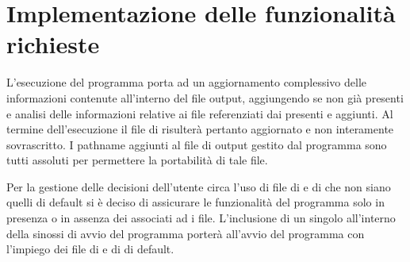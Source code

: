 \documentclass[letterpaper,10pt,italian,openany,oneside]{sphinxmanual}
\begin{document}
\section{Implementazione delle funzionalità richieste}
\label{\detokenize{project:implementazione-delle-funzionalita-richieste}}
L’esecuzione del programma porta ad un aggiornamento complessivo delle informazioni contenute all’interno del file output, aggiungendo  se non già presenti e
analisi delle informazioni relative ai file referenziati dai  presenti e aggiunti. Al termine dell’esecuzione il file di  risulterà pertanto aggiornato e
non interamente sovrascritto. I pathname aggiunti al file di output gestito dal programma sono tutti assoluti per permettere la portabilità di tale file.

Per la gestione delle decisioni dell’utente circa l’uso di file di  e di  che non siano quelli di default si è deciso di assicurare le funzionalità del programma
solo in presenza o in assenza dei  associati ad  i file. L’inclusione di un singolo  all’interno della sinossi di avvio del programma porterà
all’avvio del programma con l’impiego dei file di  e di  di default.
\end{document}
